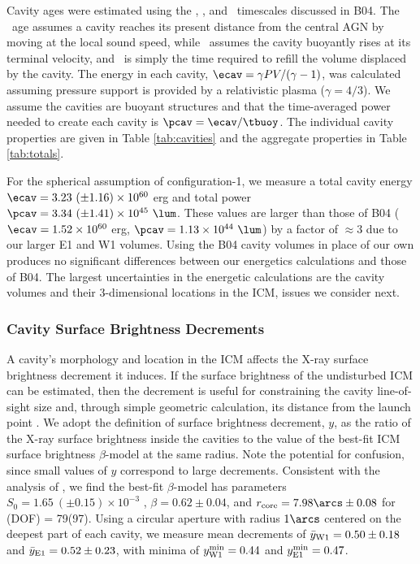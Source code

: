 \documentclass[apjpt4]{aastex}
\begin{document}
Cavity ages were estimated using the \tsonic, \tbuoy, and
\trefill\ timescales discussed in B04. The \tsonic\ age assumes a
cavity reaches its present distance from the central AGN by moving at
the local sound speed, while \tbuoy\ assumes the cavity buoyantly
rises at its terminal velocity, and \trefill\ is simply the time
required to refill the volume displaced by the cavity. The energy in
each cavity, $\ecav = \gamma PV/(\gamma-1)$, was calculated assuming
pressure support is provided by a relativistic plasma ($\gamma =
4/3$). We assume the cavities are buoyant structures and that the
time-averaged power needed to create each cavity is $\pcav =
\ecav/\tbuoy$. The individual cavity properties are given in Table
\ref{tab:cavities} and the aggregate properties in Table
\ref{tab:totals}.

For the spherical assumption of configuration-1, we measure a total
cavity energy $\ecav = 3.23 ~(\pm 1.16) \times 10^{60}$ erg and total
power $\pcav = 3.34 ~(\pm 1.41) \times 10^{45} ~\lum$. These values
are larger than those of B04 ($\ecav = 1.52 \times 10^{60}$ erg,
$\pcav = 1.13 \times 10^{44} ~\lum$) by a factor of $\approx 3$ due to
our larger E1 and W1 volumes. Using the B04 cavity volumes in place of
our own produces no significant differences between our energetics
calculations and those of B04. The largest uncertainties in the
energetic calculations are the cavity volumes and their 3-dimensional
locations in the ICM, issues we consider next.

\subsubsection{Cavity Surface Brightness Decrements}
\label{sec:dec}

A cavity's morphology and location in the ICM affects the X-ray
surface brightness decrement it induces. If the surface brightness of
the undisturbed ICM can be estimated, then the decrement is useful for
constraining the cavity line-of-sight size and, through simple
geometric calculation, its distance from the launch point
\citep[see][for details]{hydraa}. We adopt the \citet{hydraa}
definition of surface brightness decrement, $y$, as the ratio of the
X-ray surface brightness inside the cavities to the value of the
best-fit ICM surface brightness $\beta$-model at the same radius. Note
the potential for confusion, since small values of $y$ correspond to
large decrements. Consistent with the analysis of \citet{schindler01},
we find the best-fit $\beta$-model has parameters $S_0 = 1.65 ~(\pm
0.15) \times 10^{-3}$ \sbr, $\beta = 0.62 \pm 0.04$, and
$r_{\rm{core}} = 7.98\arcs \pm 0.08$ for \chisq(DOF) = 79(97). Using a
circular aperture with radius $1\arcs$ centered on the deepest part of
each cavity, we measure mean decrements of $\bar{y}_{\rm{W1}} = 0.50
\pm 0.18$ and $\bar{y}_{\rm{E1}} = 0.52 \pm 0.23$, with minima of
$y^{\rm{min}}_{\rm{W1}} = 0.44$ and $y^{\rm{min}}_{\rm{E1}} = 0.47$.
\end{document}

